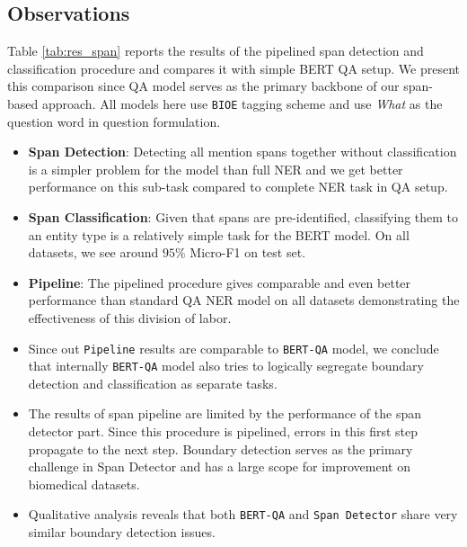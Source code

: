 \subsection{Observations}
Table \ref{tab:res_span} reports the results of the pipelined span detection and classification procedure and compares it with simple BERT QA setup. We present this comparison since QA model serves as the primary backbone of our span-based approach. All models here use \texttt{BIOE} tagging scheme and use \textit{What} as the question word in question formulation.

\begin{itemize}
    \item \textbf{Span Detection}: Detecting all mention spans together without classification is a simpler problem for the model than full NER and we get better performance on this sub-task compared to complete NER task in QA setup.
    
    \item \textbf{Span Classification}: Given that spans are pre-identified, classifying them to an entity type is a relatively simple task for the BERT model. On all datasets, we see around $95\%$ Micro-F1 on test set.
    
    \item \textbf{Pipeline}: The pipelined procedure gives comparable and even better performance than standard QA NER model on all datasets demonstrating the effectiveness of this division of labor. 
    
    \item Since out \texttt{Pipeline} results are comparable to \texttt{BERT-QA} model, we conclude that internally \texttt{BERT-QA} model also tries to logically segregate boundary detection and classification as separate tasks.
    
    \item The results of span pipeline are limited by the performance of the span detector part. Since this procedure is pipelined, errors in this first step propagate to the next step. Boundary detection serves as the primary challenge in Span Detector and has a large scope for improvement on biomedical datasets.
    
    \item Qualitative analysis reveals that both \texttt{BERT-QA} and \texttt{Span Detector} share very similar boundary detection issues.
\end{itemize}
